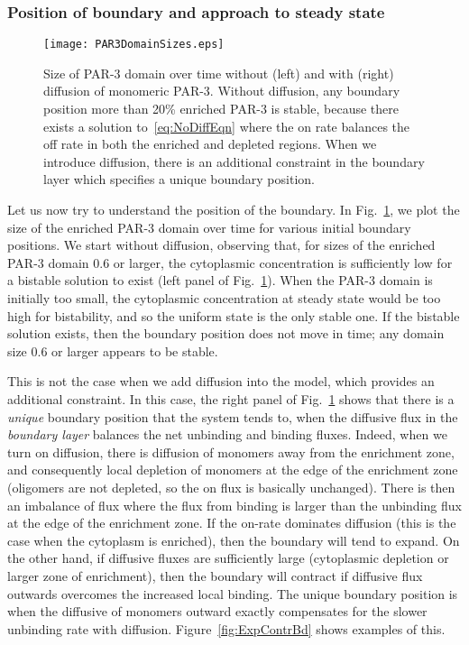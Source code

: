 \documentclass[11pt]{article}
\newcommand{\6}[1]{#1_{\text{6}}}
\newcommand{\3}[1]{#1_{\text{3}}}
\begin{document}
\subsubsection{Position of boundary and approach to steady state}

\begin{figure}
\centering
\texttt{[image: PAR3DomainSizes.eps]}
\caption{\label{fig:WWoDiff}Size of PAR-3 domain over time without (left) and with (right) diffusion of monomeric PAR-3. Without diffusion, any boundary position more than 20\% enriched PAR-3 is stable, because there exists a solution to\ \eqref{eq:NoDiffEqn} where the on rate balances the off rate in both the enriched and depleted regions. When we introduce diffusion, there is an additional constraint in the boundary layer which specifies a unique boundary position.}
\end{figure}

Let us now try to understand the position of the boundary. In Fig.\ \ref{fig:WWoDiff}, we plot the size of the enriched PAR-3 domain over time for various initial boundary positions. We start without diffusion, observing that, for sizes of the enriched PAR-3 domain 0.6 or larger, the cytoplasmic concentration is sufficiently low for a bistable solution to exist (left panel of Fig.\ \ref{fig:WWoDiff}). When the PAR-3 domain is initially too small, the cytoplasmic concentration at steady state would be too high for bistability, and so the uniform state is the only stable one. If the bistable solution exists, then the boundary position does not move in time; any domain size 0.6 or larger appears to be stable.

This is not the case when we add diffusion into the model, which provides an additional constraint. In this case, the right panel of Fig.\ \ref{fig:WWoDiff} shows that there is a \emph{unique} boundary position that the system tends to, when the diffusive flux in the \emph{boundary layer} balances the net unbinding and binding fluxes. Indeed, when we turn on diffusion, there is diffusion of monomers away from the enrichment zone, and consequently local depletion of monomers at the edge of the enrichment zone (oligomers are not depleted, so the on flux is basically unchanged). There is then an imbalance of flux where the flux from binding is larger than the unbinding flux at the edge of the enrichment zone. If the on-rate dominates diffusion (this is the case when the cytoplasm is enriched), then the boundary will tend to expand. On the other hand, if diffusive fluxes are sufficiently large (cytoplasmic depletion or larger zone of enrichment), then the boundary will contract if diffusive flux outwards overcomes the increased local binding. The unique boundary position is when the diffusive of monomers outward exactly compensates for the slower unbinding rate with diffusion. Figure\ \ref{fig:ExpContrBd} shows examples of this.
\end{document}
